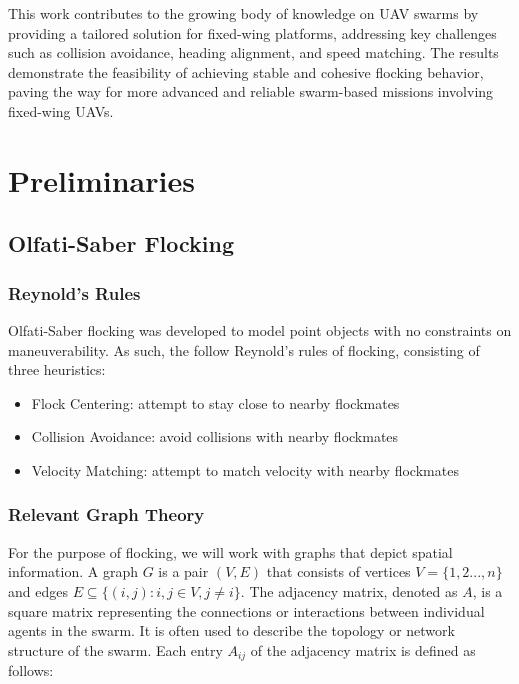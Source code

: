 \documentclass[letterpaper, 10 pt, conference]{ieeeconf}  %
\begin{document}
This work contributes to the growing body of knowledge on UAV swarms by providing a tailored solution for fixed-wing platforms, addressing key challenges such as collision avoidance, heading alignment, and speed matching. The results demonstrate the feasibility of achieving stable and cohesive flocking behavior, paving the way for more advanced and reliable swarm-based missions involving fixed-wing UAVs.

\section{Preliminaries}

\subsection{Olfati-Saber Flocking}

\subsubsection{Reynold's Rules}

\noindent Olfati-Saber flocking was developed to model point objects with no constraints on maneuverability. As such, the follow Reynold's rules of flocking, consisting of three heuristics:
\begin{itemize}
    \item Flock Centering: attempt to stay close to nearby flockmates
    \item Collision Avoidance: avoid collisions with nearby flockmates
    \item Velocity Matching: attempt to match velocity with nearby flockmates
\end{itemize}

\subsubsection{Relevant Graph Theory}

For the purpose of flocking, we will work with graphs that depict spatial information. A graph $G$ is a pair $(V,E)$ that consists of vertices $V = \{1,2...,n\}$ and edges $E \subseteq \{(i,j) : i,j \in V, j \neq i\}$. The adjacency matrix, denoted as \(A\), is a square matrix representing the connections or interactions between individual agents in the swarm. It is often used to describe the topology or network structure of the swarm. Each entry \(A_{ij}\) of the adjacency matrix is defined as follows:
\end{document}
